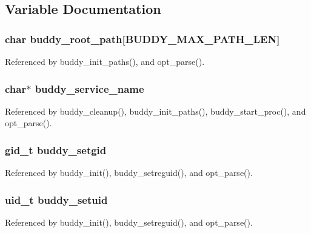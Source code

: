 \subsection{Variable Documentation}
\subsubsection[{buddy\_\-root\_\-path}]{\setlength{\rightskip}{0pt plus 5cm}char {\bf buddy\_\-root\_\-path}[BUDDY\_\-MAX\_\-PATH\_\-LEN]}\label{buddy_8h_a9715b970fd956abacde0cff8a337e0c4}


Referenced by buddy\_\-init\_\-paths(), and opt\_\-parse().

\subsubsection[{buddy\_\-service\_\-name}]{\setlength{\rightskip}{0pt plus 5cm}char$\ast$ {\bf buddy\_\-service\_\-name}}\label{buddy_8h_a46bdaaaea058028488e4a2fa4abcf80b}


Referenced by buddy\_\-cleanup(), buddy\_\-init\_\-paths(), buddy\_\-start\_\-proc(), and opt\_\-parse().

\subsubsection[{buddy\_\-setgid}]{\setlength{\rightskip}{0pt plus 5cm}gid\_\-t {\bf buddy\_\-setgid}}\label{buddy_8h_a94f0c0963c51ae59585d090bd146267c}


Referenced by buddy\_\-init(), buddy\_\-setreguid(), and opt\_\-parse().

\subsubsection[{buddy\_\-setuid}]{\setlength{\rightskip}{0pt plus 5cm}uid\_\-t {\bf buddy\_\-setuid}}\label{buddy_8h_a2ef8d11cc4ac2862fbe8ce2112e2e4fb}


Referenced by buddy\_\-init(), buddy\_\-setreguid(), and opt\_\-parse().

